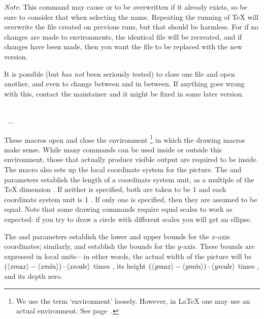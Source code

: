 \documentclass[letterpaper]{article}
\begin{document}
\emph{Note}: This command may cause  or
 to be overwritten if it already exists, so be sure
to consider that when selecting the name. Repeating the running of
\TeX{} will overwrite the file created on previous runs, but that should
be harmless. For if no changes are made to  environments, the
identical file will be recreated, and if changes have been made, then
you want the file to be replaced with the new version.

It is possible (but \emph{has not} been seriously tested) to close one
file and open another, and even to change between  and
 in between. If anything goes wrong with this, contact the
maintainer and it might be fixed in some later version.

\begin{cd}
%
  \\
  \ $\ldots$\\
%
%
\end{cd}

These macros open and close the  environment%
    \footnote{We use the term `environment' loosely. However, in
    \LaTeX{} one may use an actual  environment. See
    page~\pageref{envusage}.}
in which the drawing macros make sense. While many \mfp{} commands can
be used inside or outside this environment, those that actually produce
visible output are required to be inside. The  macro also sets
up the local coordinate system for the picture. The  and
 parameters establish the length of a coordinate system
unit, as a multiple of the \TeX{} dimension . If neither
is specified, both are taken to be 1 and each coordinate system unit is
1 . If only one is specified, then they are assumed to be
equal. Note that some drawing commands require equal scales to work as
expected: if you try to draw a circle with different scales you will get
an ellipse.

The  and  parameters establish the lower
and upper bounds for the $x$-axis coordinates; similarly, 
and  establish the bounds for the $y$-axis. These bounds are
expressed in local units---in other words, the actual width of the
picture will be $(\langle\mbox{\rmfamily\itshape xmax\/}\rangle-\langle\mbox{\rmfamily\itshape xmin\/}\rangle)\cdot\langle\mbox{\rmfamily\itshape xscale\/}\rangle$ times
, its height $(\langle\mbox{\rmfamily\itshape ymax\/}\rangle-\langle\mbox{\rmfamily\itshape ymin\/}\rangle)\cdot\langle\mbox{\rmfamily\itshape yscale\/}\rangle$
times , and its depth zero.
\end{document}
